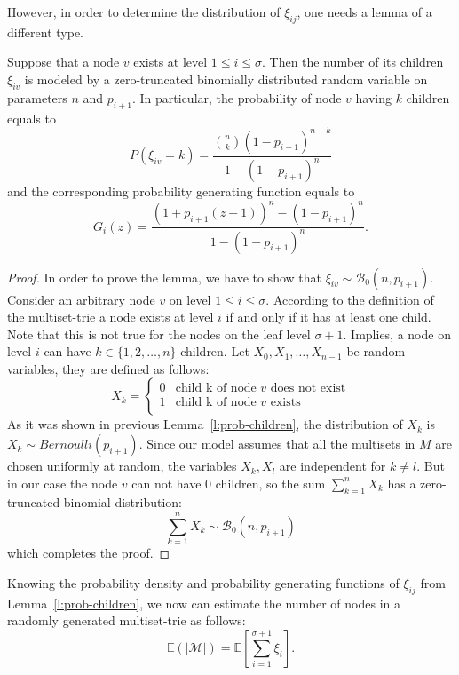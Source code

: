 However, in order to determine the distribution of $\xi_{ij}$, one needs a lemma of a different type.

\begin{lemma}\label{l:prob-children}
Suppose that a node $v$ exists at level $1\leq i\leq\sigma$.
Then the number of its children $\xi_{iv}$ is modeled by a zero-truncated binomially
distributed random variable on parameters $n$ and $p_{i+1}$. In particular,
the probability of node $v$ having $k$ children equals to
\begin{equation}\label{eq:pdf}
P(\xi_{iv} = k) = \frac{\binom{n}{k} (1-p_{i+1})^{n-k}}{1-(1-p_{i+1})^n}
\end{equation}
and the corresponding probability generating function equals to
\begin{equation}\label{eq:generating_func}
G_i(z) = \frac{(1+p_{i+1}(z-1))^n - (1-p_{i+1})^n}{1-(1-p_{i+1})^n}.
\end{equation}
\end{lemma}
\begin{proof}
In order to prove the lemma, we have to show that
$\xi_{iv}\sim\mathcal{B}_0(n, p_{i+1}).$
Consider an arbitrary node $v$ on level $1\leq i\leq\sigma.$ According to the
definition of the multiset-trie a node exists at level $i$ if and only if
it has at least one child. Note that this is not true for the nodes on the leaf
level $\sigma + 1.$ Implies, a node on level $i$ can have
$k\in\{ 1,2,\ldots, n\}$ children. Let $X_0, X_1, \ldots, X_{n-1}$ be random
variables, they are defined as follows:
\[
X_k = \begin{cases}
0 & \textrm{child k of node $v$ does not exist} \\
1 & \textrm{child k of node $v$ exists} \\
\end{cases}
\]
As it was shown in previous Lemma~\ref{l:prob-children}, the distribution of 
$X_k$ is $X_k\sim Bernoulli(p_{i+1}).$ Since our model assumes that all the 
multisets in $M$ are chosen uniformly at random, the variables 
$X_k,X_l$ are independent for $k\neq l.$ But in our case the node $v$ can not 
have 0 children, so the sum $\sum_{k=1}^n X_k$ has a zero-truncated binomial 
distribution:
%
\[
\sum_{k=1}^n X_k \sim\mathcal{B}_0(n,p_{i+1})
\]
%
which completes the proof.
\end{proof}
%
Knowing the probability density and probability generating functions of $\xi_{ij}$ 
from Lemma~\ref{l:prob-children}, we now can estimate the number of nodes in 
a randomly generated multiset-trie as follows:
%
\begin{equation}\label{eq:num_nodes}
\mathbb{E}( | \mathcal{M} | ) = \mathbb{E}\left[ \sum_{i=1}^{\sigma+1} \xi_i \right].
\end{equation}
%


